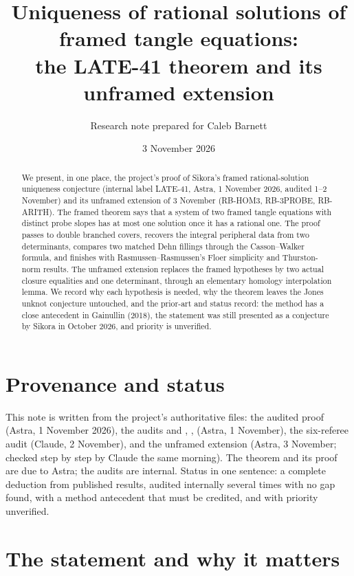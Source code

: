 \documentclass[11pt]{amsart}
\title[Uniqueness of rational solutions of framed tangle equations]{Uniqueness of rational solutions of framed tangle equations:\\ the LATE-41 theorem and its unframed extension}
\author{Research note prepared for Caleb Barnett}
\date{3 November 2026}
\theoremstyle{remark}
\begin{document}
\begin{abstract}
We present, in one place, the project's proof of Sikora's framed rational-solution uniqueness conjecture (internal label LATE-41, Astra, 1 November 2026, audited 1--2 November) and its unframed extension of 3 November (RB-HOM3, RB-3PROBE, RB-ARITH). The framed theorem says that a system of two framed tangle equations with distinct probe slopes has at most one solution once it has a rational one. The proof passes to double branched covers, recovers the integral peripheral data from two determinants, compares two matched Dehn fillings through the Casson--Walker formula, and finishes with Rasmussen--Rasmussen's Floer simplicity and Thurston-norm results. The unframed extension replaces the framed hypotheses by two actual closure equalities and one determinant, through an elementary homology interpolation lemma. We record why each hypothesis is needed, why the theorem leaves the Jones unknot conjecture untouched, and the prior-art and status record: the method has a close antecedent in Gainullin (2018), the statement was still presented as a conjecture by Sikora in October 2026, and priority is unverified.
\end{abstract}

\maketitle

\section*{Provenance and status}

This note is written from the project's authoritative files: the audited proof  (Astra, 1 November 2026), the audits  and , ,  (Astra, 1 November), the six-referee audit  (Claude, 2 November), and the unframed extension  (Astra, 3 November; checked step by step by Claude the same morning). The theorem and its proof are due to Astra; the audits are internal. Status in one sentence: a complete deduction from published results, audited internally several times with no gap found, with a method antecedent that must be credited, and with priority unverified.

\section{The statement and why it matters}
\end{document}
